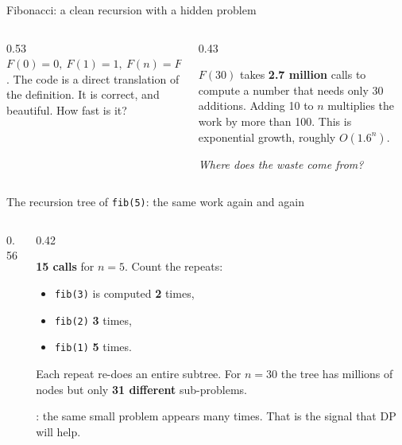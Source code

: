 \documentclass[aspectratio=169,10pt]{beamer}
\begin{document}
\begin{frame}{Fibonacci: a clean recursion with a hidden problem}
\begin{columns}[T]
\begin{column}{0.53\textwidth}
\vspace{2mm}
{\small $F(0)=0,\ F(1)=1,\ F(n)=F(n-1)+F(n-2)$. The code is a direct translation of the definition. It is correct, and beautiful. How fast is it?}
\end{column}
\begin{column}{0.43\textwidth}
\vspace{2mm}
{\small
$F(30)$ takes \textbf{2.7 million} calls to compute a number that needs only 30 additions. Adding 10 to $n$ multiplies the work by more than 100. This is exponential growth, roughly $O(1.6^n)$.

\vspace{2mm}
\emph{Where does the waste come from?}}
\end{column}
\end{columns}
\end{frame}

\begin{frame}{The recursion tree of \texttt{fib(5)}: the same work again and again}
\begin{columns}[T]
\begin{column}{0.56\textwidth}
\begin{sfig}[0.72]
\end{sfig}
\end{column}
\begin{column}{0.42\textwidth}
{\small
\textbf{15 calls} for $n=5$. Count the repeats:
\begin{itemize}\setlength\itemsep{2pt}
\item \colorbox{tdAmber!40}{\texttt{fib(3)}} is computed \textbf{2} times,
\item \colorbox{tdPurple!25}{\texttt{fib(2)}} \textbf{3} times,
\item \colorbox{tdRed!15}{\texttt{fib(1)}} \textbf{5} times.
\end{itemize}
Each repeat re-does an entire subtree. For $n=30$ the tree has millions of nodes but only \textbf{31 different} sub-problems.

\vspace{2mm}
: the same small problem appears many times. That is the signal that DP will help.}
\end{column}
\end{columns}
\end{frame}
\end{document}
